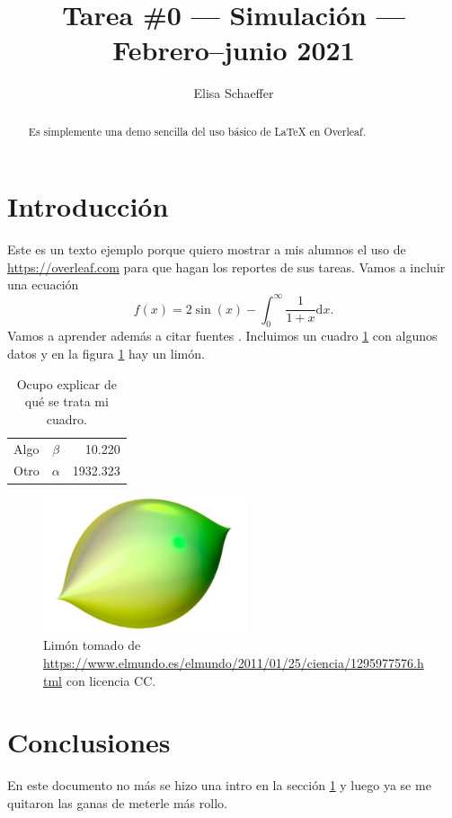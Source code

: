 \documentclass{amsart}
\author{Elisa Schaeffer}
\title{Tarea \#0 --- Simulación --- Febrero--junio 2021}
\begin{document}
\thispagestyle{empty}

\maketitle

\begin{abstract}
Es simplemente una demo sencilla del uso básico de \LaTeX{} en Overleaf.
\end{abstract}

\section{Introducción}
\label{intro}

Este es un texto ejemplo porque quiero mostrar a mis alumnos el uso de \url{https://overleaf.com} para que hagan los reportes de sus tareas. Vamos a incluir una ecuación
\begin{equation}
    f(x) = 2 \sin(x) - \int_0^\infty \frac{1}{1 + x} \text{d}x.
\end{equation}
Vamos a aprender además a citar fuentes \citep{ejemplo}. Incluimos un cuadro \ref{datos} con algunos datos y en la figura \ref{limon} hay un limón.

\begin{table}[b]
    \caption{Ocupo explicar de qué se trata mi cuadro.}
    \label{datos}
    \centering
    \begin{tabular}{l|cr}
         Algo & $\beta$ & 10.220 \\
         Otro & $\alpha$ & 1932.323
    \end{tabular}
\end{table}

\begin{figure}[b]
    \centering
    \includegraphics[width=60mm]{limon.jpg}
    \caption{Limón tomado de \url{https://www.elmundo.es/elmundo/2011/01/25/ciencia/1295977576.html} con licencia CC.}
    \label{limon}
\end{figure}

\section{Conclusiones}

En este documento no más se hizo una intro en la sección \ref{intro} y luego ya se me quitaron las ganas de meterle más rollo.



\end{document}
